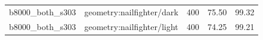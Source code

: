 \begin{longtable}{l>{\raggedright\arraybackslash}p{.42\linewidth}rrr}
b8000\_\allowbreak{}both\_\allowbreak{}s303 & %
geometry:nailfighter/dark & %
400 & %
75.50 & %
99.32 \\ %

b8000\_\allowbreak{}both\_\allowbreak{}s303 & %
geometry:nailfighter/light & %
400 & %
74.25 & %
99.21 \\ %


\end{longtable}
